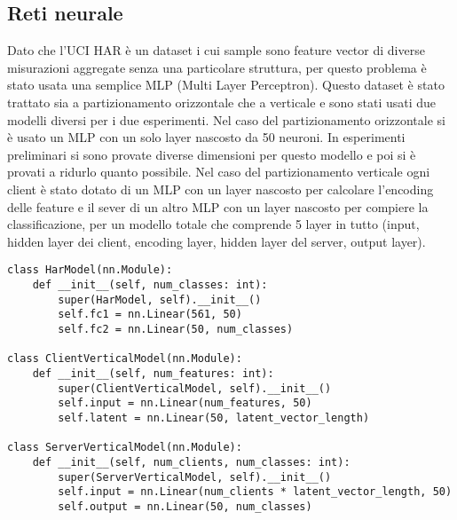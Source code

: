 \subsection{Reti neurale}
Dato che l'UCI HAR è un dataset i cui sample sono feature vector di 
diverse misurazioni aggregate senza una particolare struttura, per 
questo problema è stato usata una semplice MLP (Multi Layer Perceptron).
Questo dataset è stato trattato sia a partizionamento orizzontale che 
a verticale e sono stati usati due modelli diversi per i due esperimenti.
Nel caso del partizionamento orizzontale si è usato un MLP con un solo 
layer nascosto da 50 neuroni. In esperimenti preliminari si sono provate 
diverse dimensioni per questo modello e poi si è provati a ridurlo 
quanto possibile.
Nel caso del partizionamento verticale ogni client è stato dotato di un 
MLP con un layer nascosto per calcolare l'encoding delle feature e il
sever di un altro MLP con un layer nascosto per compiere la 
classificazione, per un modello totale che 
comprende 5 layer in tutto (input, hidden layer dei client, encoding 
layer, hidden layer del server, output layer).
\begin{lstlisting}
class HarModel(nn.Module):
    def __init__(self, num_classes: int):
        super(HarModel, self).__init__()
        self.fc1 = nn.Linear(561, 50)
        self.fc2 = nn.Linear(50, num_classes)

class ClientVerticalModel(nn.Module):
    def __init__(self, num_features: int):
        super(ClientVerticalModel, self).__init__()
        self.input = nn.Linear(num_features, 50)
        self.latent = nn.Linear(50, latent_vector_length)

class ServerVerticalModel(nn.Module):
    def __init__(self, num_clients, num_classes: int):
        super(ServerVerticalModel, self).__init__()
        self.input = nn.Linear(num_clients * latent_vector_length, 50)
        self.output = nn.Linear(50, num_classes)
\end{lstlisting}
